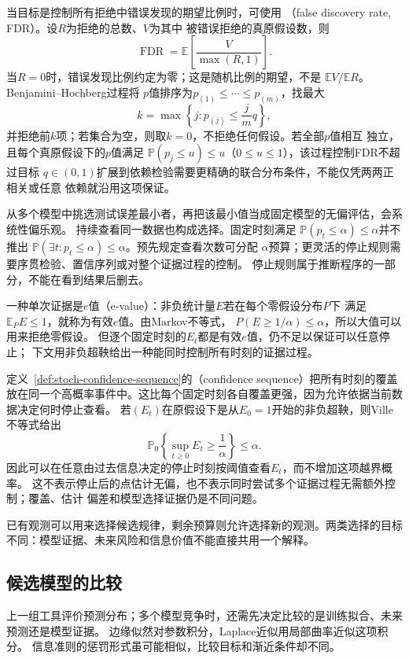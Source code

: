 当目标是控制所有拒绝中错误发现的期望比例时，可使用
（false discovery rate, FDR）。设\(R\)为拒绝的总数、\(V\)为其中
被错误拒绝的真原假设数，则
\[
  \operatorname{FDR}=\mathbb E\left[\frac{V}{\max(R,1)}\right].
\]
当\(R=0\)时，错误发现比例约定为零；这是随机比例的期望，不是
\(\mathbb EV/\mathbb ER\)。Benjamini--Hochberg过程将
\(p\)值排序为\(p_{(1)}\leq\cdots\leq p_{(m)}\)，找最大
\[
  k=\max\left\{j:p_{(j)}\leq\frac{j}{m}q\right\},
\]
并拒绝前\(k\)项；若集合为空，则取\(k=0\)，不拒绝任何假设。若全部\(p\)值相互
独立，且每个真原假设下的\(p\)值满足
\(\mathbb P(p_j\leq u)\leq u\)（\(0\leq u\leq1\)），该过程控制FDR不超过目标
\(q\in(0,1)\)扩展到依赖检验需要更精确的联合分布条件，不能仅凭两两正相关或任意
依赖就沿用这项保证。

从多个模型中挑选测试误差最小者，再把该最小值当成固定模型的无偏评估，会系统性偏乐观。
持续查看同一数据也构成选择。固定时刻满足
\(\mathbb{P}(p_t\leq\alpha)\leq\alpha\)并不推出
\(\mathbb{P}(\exists t:p_t\leq\alpha)\leq\alpha\)。预先规定查看次数可分配
\(\alpha\)预算；更灵活的停止规则需要序贯检验、置信序列或对整个证据过程的控制。
停止规则属于推断程序的一部分，不能在看到结果后删去。

一种单次证据是\(e\)值（e-value）：非负统计量\(E\)若在每个零假设分布\(P\)下
满足\(\mathbb E_PE\leq1\)，就称为有效\(e\)值。由Markov不等式，
\(P(E\geq1/\alpha)\leq\alpha\)，所以大值可以用来拒绝零假设。
但逐个固定时刻的\(E_t\)都是有效\(e\)值，仍不足以保证可以任意停止；
下文用非负超鞅给出一种能同时控制所有时刻的证据过程。

定义~\ref{def:stoch-confidence-sequence}的（confidence sequence）把所有时刻的覆盖放在同一个高概率事件中。这比每个固定时刻各自覆盖更强，因为允许依据当前数据决定何时停止查看。
若\((E_t)\)在原假设下是从\(E_0=1\)开始的非负超鞅，则Ville不等式给出
\[
  \mathbb{P}_0\left\{\sup_{t\geq0}E_t\geq\frac1\alpha\right\}\leq\alpha.
\]
因此可以在任意由过去信息决定的停止时刻按阈值查看\(E_t\)，而不增加这项越界概率。
这不表示停止后的点估计无偏，也不表示同时尝试多个证据过程无需额外控制；覆盖、估计
偏差和模型选择证据仍是不同问题。

\label{sec:stats-model-comparison-data-acquisition}
已有观测可以用来选择候选规律，剩余预算则允许选择新的观测。两类选择的目标不同：模型证据、未来风险和信息价值不能直接共用一个解释。

\subsection{候选模型的比较}
\label{sec:statistics-model-evidence}
上一组工具评价预测分布；多个模型竞争时，还需先决定比较的是训练拟合、未来预测还是模型证据。
边缘似然对参数积分，Laplace近似用局部曲率近似这项积分。
信息准则的惩罚形式虽可能相似，比较目标和渐近条件却不同。

